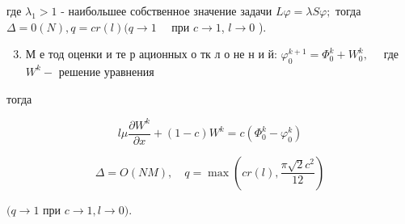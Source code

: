 \documentclass[10pt]{article}
\begin{document}
где $\lambda_{1}>1$ - наибольшее собственное значение задачи $L \varphi=\lambda S \varphi ;$ тогда $\Delta=0(N), q=c r(l)(q \rightarrow 1 \quad$ при $c \rightarrow 1$, $l \rightarrow 0$ ).



\begin{enumerate}

  \setcounter{enumi}{2}

  \item М е тод оценки и те р ационных о тк л о не н и й: $\varphi_{0}^{k+1}=\Phi_{0}^{k}+W_{0}^{k}, \quad$ где $W^{k}-$ решение уравнения

\end{enumerate}



тогда



\[

l \mu \frac{\partial W^{k}}{\partial x}+(1-c) W^{k}=c\left(\Phi_{0}^{k}-\varphi_{0}^{k}\right)

\]



\[

\Delta=O(N M), \quad q=\max \left(c r(l), \frac{\pi \sqrt{2} c^{2}}{12}\right)

\]



$(q \rightarrow 1$ при $c \rightarrow 1, l \rightarrow 0)$.
\end{document}
